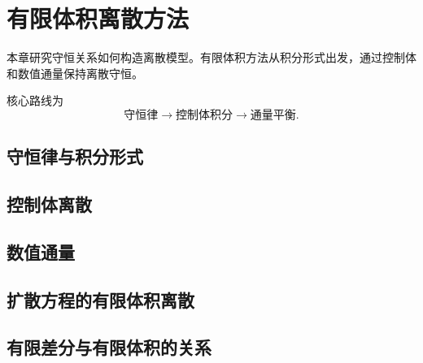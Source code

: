 \chapter{有限体积离散方法}
\label{ch:finite-volume}

本章研究守恒关系如何构造离散模型。有限体积方法从积分形式出发，通过控制体和数值通量保持离散守恒。

核心路线为
\[
\text{守恒律}\rightarrow\text{控制体积分}\rightarrow\text{通量平衡}.
\]

\section{守恒律与积分形式}

\section{控制体离散}

\section{数值通量}

\section{扩散方程的有限体积离散}

\section{有限差分与有限体积的关系}
